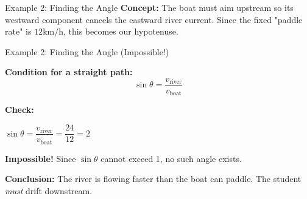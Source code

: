 \documentclass{beamer}
\begin{document}
\begin{frame}{Example 2: Finding the Angle}
\textbf{Concept:} The boat must aim upstream so its westward component cancels the eastward river current. Since the fixed "paddle rate" is $12 \text{km/h}$, this becomes our hypotenuse.

\begin{center}
\end{center}

\vspace{0.3cm}


\end{frame}


\begin{frame}{Example 2: Finding the Angle (Impossible!)}

\textbf{Condition for a straight path:}
\[
\sin\theta = \frac{v_{\text{river}}}{v_{\text{boat}}}
\]

\vspace{0.3cm}
\textbf{Check:} 
\begin{center}\(\sin\theta = \dfrac{v_{\text{river}}}{v_{\text{boat}}} = \dfrac{24}{12} = 2\)
\end{center}

\vspace{0.3cm}
\textbf{Impossible!} Since \(\sin\theta\) cannot exceed 1, no such angle exists.

\vspace{0.3cm}
\textbf{Conclusion:} The river is flowing faster than the boat can paddle.  
The student \textit{must} drift downstream.

\end{frame}
\end{document}

